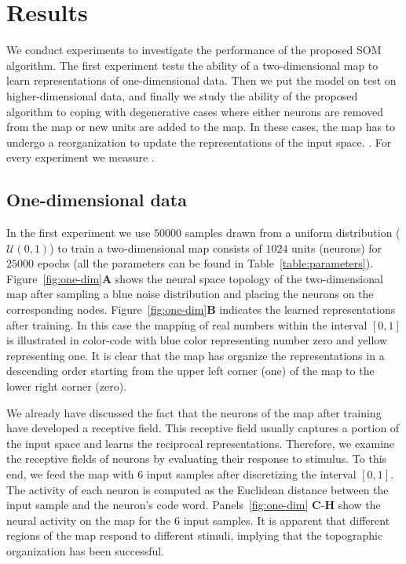 \section{Results}

We conduct  experiments to investigate the performance of the 
proposed SOM algorithm. The first experiment tests the ability of a
two-dimensional map to learn representations of one-dimensional data.
Then we put the model on test on higher-dimensional data, and finally we
study the ability of the proposed algorithm to coping with degenerative
cases where either neurons are removed from the map or new units are added 
to the map. In these cases, the map has to undergo a reorganization to 
update the representations of the input space. . 
For every experiment we measure . 

\subsection{One-dimensional data}

In the first experiment we use $50000$ samples drawn from a uniform distribution
($\mathcal{U}(0, 1)$) to train a two-dimensional map consists of $1024$ units
(neurons) for $25000$ epochs (all the parameters can be found in
Table~\ref{table:parameters}). Figure~\ref{fig:one-dim}{\bfseries \sffamily A}
shows the neural space topology of the two-dimensional map after sampling a 
blue noise distribution and placing the neurons on the corresponding nodes.
Figure~\ref{fig:one-dim}{\bfseries \sffamily B} indicates the learned 
representations after training. In this case the mapping of real numbers within
the interval $[0, 1]$ is illustrated in color-code with blue color representing
number zero and yellow representing one. It is clear that the map has organize
the representations in a descending order starting from the upper left corner
(one) of the map to the lower right corner (zero).

We already have discussed the fact that the neurons of the map after training
have developed a receptive field. This receptive field usually captures a
portion of the input space and learns the reciprocal representations.
Therefore, we examine the receptive fields of neurons by evaluating their 
response to stimulus. To this end, we feed the map with $6$ input samples 
after discretizing the interval $[0, 1]$. The activity of each neuron is 
computed as the Euclidean distance between the input sample and the neuron's
code word. Panels~\ref{fig:one-dim} {\sffamily \bfseries C}-{\sffamily \bfseries H} 
show the neural activity on the map for the $6$ input samples. It is apparent
that different regions of the map respond to different stimuli, implying that
the topographic organization has been successful. 


